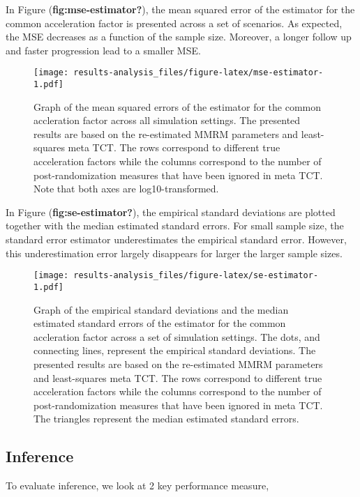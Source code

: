 \documentclass[
]{article}
\begin{document}
In Figure (\textbf{fig:mse-estimator?}), the mean squared error of the estimator for the
common acceleration factor is presented across a set of scenarios. As expected,
the MSE decreases as a function of the sample size. Moreover, a longer follow up
and faster progression lead to a smaller MSE.

\begin{figure}
\centering
\texttt{[image: results-analysis\_files/figure-latex/mse-estimator-1.pdf]}
\caption{\label{fig:mse-estimator}Graph of the mean squared errors of the estimator for the common accleration factor across all simulation settings. The presented results are based on the re-estimated MMRM parameters and least-squares meta TCT. The rows correspond to different true acceleration factors while the columns correspond to the number of post-randomization measures that have been ignored in meta TCT. Note that both axes are log10-transformed.}
\end{figure}

In Figure (\textbf{fig:se-estimator?}), the empirical standard deviations are plotted
together with the median estimated standard errors. For small sample size, the
standard error estimator underestimates the empirical standard error. However,
this underestimation error largely disappears for larger the larger sample sizes.

\begin{figure}
\centering
\texttt{[image: results-analysis\_files/figure-latex/se-estimator-1.pdf]}
\caption{\label{fig:se-estimator}Graph of the empirical standard deviations and the median estimated standard errors of the estimator for the common accleration factor across a set of simulation settings. The dots, and connecting lines, represent the empirical standard deviations. The presented results are based on the re-estimated MMRM parameters and least-squares meta TCT. The rows correspond to different true acceleration factors while the columns correspond to the number of post-randomization measures that have been ignored in meta TCT. The triangles represent the median estimated standard errors.}
\end{figure}

\hypertarget{inference}{%
\subsection{Inference}\label{inference}}

To evaluate inference, we look at 2 key performance measure,
\end{document}
